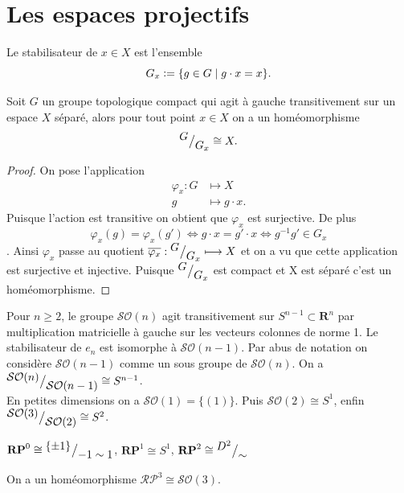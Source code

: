\documentclass[main.tex]{subfiles}
\begin{document}
	\section{Les espaces projectifs}

	\begin{definition}[Stabilisateur]
		Le stabilisateur de $x\in X$ est l'ensemble \[
			G_x \vcentcolon= \{g\in G \;|\; g\cdot x = x\} 
		.\] 	
	\end{definition}
	\begin{prop}
		Soit $G$ un groupe topologique compact qui agit à gauche transitivement sur un espace $X$ séparé, alors pour tout point $x\in X$ on a un homéomorphisme  \[
			{^{\textstyle G}\big/_{\textstyle G_x}} \cong X
		.\] 
	\end{prop}
	\begin{proof}
		On pose l'application 
		\begin{align*}
			\varphi_x : G&\longmapsto X \\
			g &\longmapsto g\cdot x
		.\end{align*}
		Puisque l'action est transitive on obtient que $\varphi_x$ est surjective. De plus $$\varphi_x(g) = \varphi_x(g') \iff g\cdot x = g'\cdot x \iff g^{-1}g' \in G_x$$. Ainsi $\varphi_x$ passe au quotient  $\overline{\varphi_x} : {^{\textstyle G}\big/_{\textstyle G_x}} \longmapsto X$ et on a vu que cette application est surjective et injective. Puisque ${^{\textstyle G}\big/_{\textstyle G_x}}$ est compact et X est séparé c'est un homéomorphisme.
	\end{proof}

	\begin{example}
		Pour $ n\ge 2$, le groupe $\mathcal{SO}(n)$ agit transitivement sur $S^{n-1} \subset \mathbf{R}^{n}$ par multiplication matricielle à gauche sur les vecteurs colonnes de norme 1.
		Le stabilisateur de $e_n$ est isomorphe à $\mathcal{SO}(n-1)$. Par abus de notation on considère $\mathcal{SO}(n-1)$ comme un sous groupe de $\mathcal{SO}(n)$. On a ${^{\textstyle \mathcal{SO}(n)}\big/_{\textstyle \mathcal{SO}(n-1)}} \cong S^{n-1}$.\\
		En petites dimensions on a $\mathcal{SO}(1) = \{(1)\}$. Puis $\mathcal{SO}(2) \cong S^1$, enfin ${^{\textstyle \mathcal{SO}(3)}\big/_{\textstyle \mathcal{SO}(2)}} \cong S^2$.
	\end{example}
	\begin{remark}
$\mathbf{RP}^0 \cong {^{\textstyle \{\pm 1\}}\big/_{\textstyle -1 \sim 1}}$, $\mathbf{RP}^1 \cong S^1$, $\mathbf{RP}^2 \cong {^{\textstyle D^2}\big/_{\textstyle \sim}}$
	\end{remark}
	\begin{prop}
		On a un homéomorphisme $\mathcal{RP}^3 \cong \mathcal{SO}(3)$.
	\end{prop}
\end{document}
